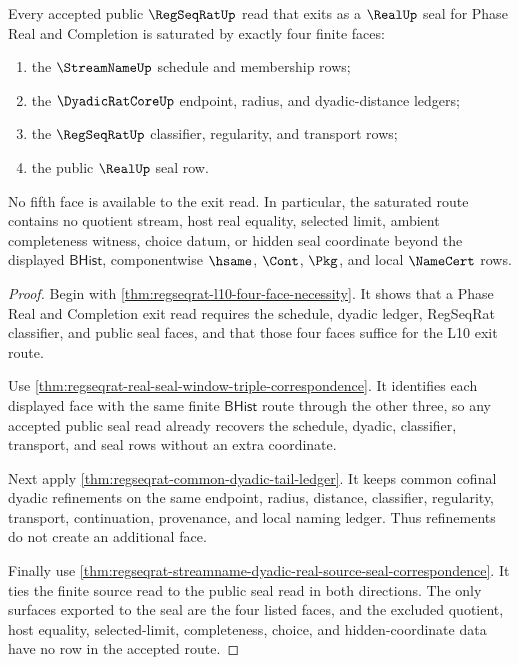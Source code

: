 \begin{theorem}
\label{thm:regseqrat-real-seal-finite-window-saturation}
Every accepted public $\RegSeqRatUp$ read that exits as a $\RealUp$ seal for
Phase Real and Completion is saturated by exactly four finite faces:
\begin{enumerate}
\item the $\StreamNameUp$ schedule and membership rows;
\item the $\DyadicRatCoreUp$ endpoint, radius, and dyadic-distance ledgers;
\item the $\RegSeqRatUp$ classifier, regularity, and transport rows;
\item the public $\RealUp$ seal row.
\end{enumerate}
No fifth face is available to the exit read. In particular, the saturated
route contains no quotient stream, host real equality, selected limit,
ambient completeness witness, choice datum, or hidden seal coordinate beyond
the displayed $\mathsf{BHist}$, componentwise $\hsame$, $\Cont$, $\Pkg$, and
local $\NameCert$ rows.
\end{theorem}
\begin{proof}
Begin with \autoref{thm:regseqrat-l10-four-face-necessity}. It shows that a
Phase Real and Completion exit read requires the schedule, dyadic ledger,
RegSeqRat classifier, and public seal faces, and that those four faces
suffice for the L10 exit route.

Use
\autoref{thm:regseqrat-real-seal-window-triple-correspondence}. It identifies
each displayed face with the same finite $\mathsf{BHist}$ route through the
other three, so any accepted public seal read already recovers the schedule,
dyadic, classifier, transport, and seal rows without an extra coordinate.

Next apply \autoref{thm:regseqrat-common-dyadic-tail-ledger}. It keeps common
cofinal dyadic refinements on the same endpoint, radius, distance,
classifier, regularity, transport, continuation, provenance, and local naming
ledger. Thus refinements do not create an additional face.

Finally use
\autoref{thm:regseqrat-streamname-dyadic-real-source-seal-correspondence}. It
ties the finite source read to the public seal read in both directions. The
only surfaces exported to the seal are the four listed faces, and the
excluded quotient, host equality, selected-limit, completeness, choice, and
hidden-coordinate data have no row in the accepted route.
\end{proof}

